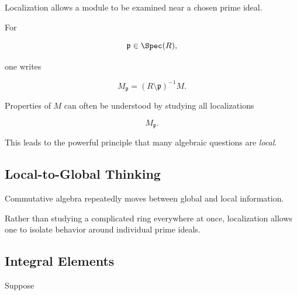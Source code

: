 Localization allows a module to be examined near a chosen prime ideal.

For

\[ \mathfrak p\in\Spec(R), \]

one writes

\[ M_{\mathfrak p}=(R\setminus\mathfrak p)^{-1}M. \]

Properties of \(M\) can often be understood by studying all localizations

\[ M_{\mathfrak p}. \]

This leads to the powerful principle that many algebraic questions are
\emph{local}.

\subsection{Local-to-Global Thinking}
\label{subsec:local-global-thinking}

Commutative algebra repeatedly moves between global and local information.

\begin{center}
\end{center}

Rather than studying a complicated ring everywhere at once, localization
allows one to isolate behavior around individual prime ideals.

\subsection{Integral Elements}
\label{subsec:integral-elements}

Suppose

